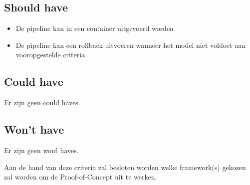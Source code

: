 \subsection*{Should have}

\begin{itemize}
    \item De pipeline kan in een container uitgevoerd worden
    \item De pipeline kan een rollback uitvoeren wanneer het model niet voldoet aan vooropgestelde criteria
\end{itemize}

\subsection*{Could have}

Er zijn geen could haves.

\subsection*{Won't have}

Er zijn geen won\'t haves.

Aan de hand van deze criteria zal besloten worden welke framework(s) gekozen zal worden om de Proof-of-Concept uit te werken.

